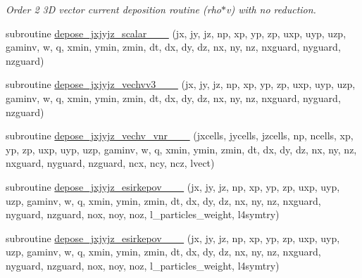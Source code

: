 \begin{DoxyCompactItemize}
\begin{DoxyCompactList}\small\item\em Order 2 3D vector current deposition routine (rho$\ast$v) with no reduction. \end{DoxyCompactList}\item 
subroutine \hyperlink{current__deposition_8_f90_a9b0dd01b38cde503f1aac44bb2bd1ca8}{depose\+\_\+jxjyjz\+\_\+scalar\+\_\+\_\+\_} (jx, jy, jz, np, xp, yp, zp, uxp, uyp, uzp, gaminv, w, q, xmin, ymin, zmin,                                       dt, dx, dy, dz, nx, ny, nz, nxguard, nyguard, nzguard)
\item 
subroutine \hyperlink{current__deposition_8_f90_a4b4bb06ef5eb6ca6e28d2c24472fb216}{depose\+\_\+jxjyjz\+\_\+vechvv3\+\_\+\_\+\_} (jx, jy, jz, np, xp, yp, zp, uxp, uyp, uzp, gaminv, w, q, xmin, ymin, zmin,                                       dt, dx, dy, dz, nx, ny, nz, nxguard, nyguard, nzguard)
\item 
subroutine \hyperlink{current__deposition_8_f90_a95bde392441e1836c282cd5b53c6e5c1}{depose\+\_\+jxjyjz\+\_\+vechv\+\_\+vnr\+\_\+\_\+\_} (jxcells, jycells, jzcells, np, ncells, xp, yp, zp,                                   uxp, uyp, uzp, gaminv, w, q, xmin, ymin, zmin,                                       dt, dx, dy, dz, nx, ny, nz, nxguard, nyguard, nzguard, ncx, ncy, ncz, lvect)
\item 
subroutine \hyperlink{current__deposition_8_f90_ad43ded0ebf597e9d3cb47ff84ec04413}{depose\+\_\+jxjyjz\+\_\+esirkepov\+\_\+\_\+\_} (jx, jy, jz, np, xp, yp, zp, uxp, uyp, uzp, gaminv, w, q, xmin, ymin, zmin,                                                                                                                                                   dt, dx, dy, dz, nx, ny, nz, nxguard, nyguard, nzguard,                                                                                                                                                   nox, noy, noz, l\+\_\+particles\+\_\+weight, l4symtry)
\item 
subroutine \hyperlink{current__deposition_8_f90_a1b0279f68e8d25ed75dea74ec525c04b}{depose\+\_\+jxjyjz\+\_\+esirkepov\+\_\+\_\+\_} (jx, jy, jz, np, xp, yp, zp, uxp, uyp, uzp, gaminv, w, q, xmin, ymin, zmin,                                                                                                                                                   dt, dx, dy, dz, nx, ny, nz, nxguard, nyguard, nzguard,                                                                                                                                                   nox, noy, noz, l\+\_\+particles\+\_\+weight, l4symtry)

\end{DoxyCompactItemize}
